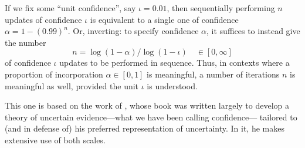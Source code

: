 %
If we fix some ``unit confidence'', say $\iota=0.01$,
then sequentially performing $n$ updates of confidence $\iota$ is 
equivalent to a single one of confidence $\alpha= 1-(0.99)^n$.
Or, inverting:
to specify confidence $\alpha$, it suffices to 
instead give the number
\begin{equation} \label{eq:loglogiota}
 	n = \log (1 - \alpha ) / \log(1-\iota) 
	\quad\in[0,\infty]
\end{equation}
of confidence $\iota$ updates to be performed in sequence.
Thus,
in contexts where a proportion of incorporation $\alpha\in[0,1]$ is meaningful,
a number of iterations $n$ is meaningful as well, provided the unit
$\iota$ is understood.

\TODO


This one is based on the work of 
\citeauthor{shafer1976mathematical},
whose 
\citeyear{shafer1976mathematical} book
was written largely 
to develop a theory of uncertain evidence---what we have been calling confidence---%
tailored to (and in defense of) his preferred representation of uncertainty.
In it, he makes extensive use of both scales.
%


